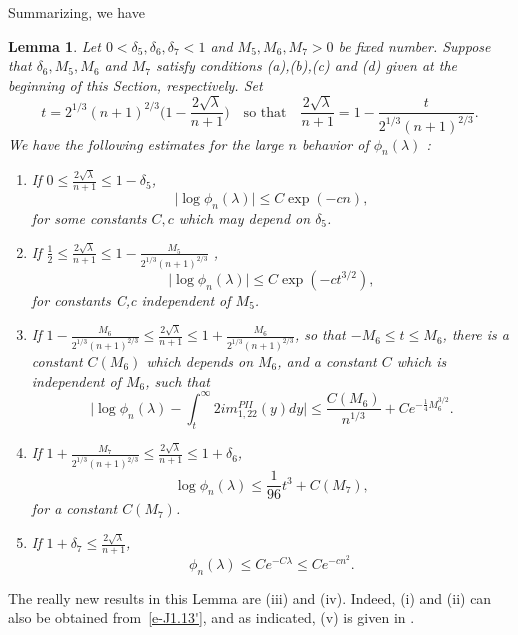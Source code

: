 \documentclass{amsart}
\newtheorem{lem}[thm]{Lemma}
\theoremstyle{definition}
\theoremstyle{remark}
\numberwithin{equation}{section}
\begin{document}
\bigskip
Summarizing, we have
\begin{lem}\label{lem-phi}
  Let $0<\delta_5,\delta_6,\delta_7<1$ and $M_5,M_6,M_7>0$ be fixed number.
  Suppose that $\delta_6, M_5, M_6$ and $M_7$ satisfy conditions 
(a),(b),(c) and (d) given at the beginning of this Section, respectively.
  Set 
\begin{equation}\label{e-z42}
    t=2^{1/3}(n+1)^{2/3}\bigl(1-\frac{2\sqrt{\lambda}}{n+1}\bigr)
\quad\text{so that}\quad 
\frac{2\sqrt{\lambda}}{n+1}=1-\frac{t}{2^{1/3}(n+1)^{2/3}}.
\end{equation}
  We have the following estimates for the large $n$ 
behavior of $\phi_n(\lambda)$ : 
  \begin{enumerate}
    \item If $0\le \frac{2\sqrt{\lambda}}{n+1} \le 1-\delta_5$,  
\begin{equation*}
  \bigl| \log{\phi_n(\lambda)} \bigr| \le C\exp(-cn), 
\end{equation*}
for some constants $C,c$ which may depend on $\delta_5$.
    \item If $\frac12 \le \frac{2\sqrt{\lambda}}{n+1} 
\le 1-\frac{M_5}{2^{1/3}{(n+1)}^{2/3}}$ ,
\begin{equation*}
  \bigl| \log{\phi_n(\lambda)} \bigr| \le C\exp(-ct^{3/2}),
\end{equation*}
for constants C,c independent of $M_5$.
    \item If $1-\frac{M_6}{2^{1/3}{(n+1)}^{2/3}} \le 
\frac{2\sqrt{\lambda}}{n+1} \le 1+\frac{M_6}{2^{1/3}{(n+1)}^{2/3}}$, 
so that $-M_6\le t\le M_6$, 
there is a constant $C(M_6)$ which depends on $M_6$, 
and a constant $C$ which is independent of $M_6$,  
such that 
\begin{equation*}
  \bigl| \log{\phi_n(\lambda)} - \int_{t}^{\infty} 2im^{PII}_{1,22}(y) dy \bigr|
\le \frac{C(M_6)}{n^{1/3}}+Ce^{-\frac14M_6^{3/2}}.
\end{equation*}
    \item If $1+\frac{M_7}{2^{1/3}{(n+1)}^{2/3}} \le \frac{2\sqrt{\lambda}}{n+1}
\le 1+\delta_6$, 
\begin{equation*}
      \log \phi_n(\lambda) \le \frac1{96}t^3 + C(M_7),
\end{equation*}
for a constant $C(M_7)$.
   \item \cite{Johan} If $1+\delta_7 \le \frac{2\sqrt{\lambda}}{n+1}$,
\begin{equation*}
   \phi_n(\lambda)\le Ce^{-C\lambda} \le Ce^{-cn^2}.
\end{equation*}
  \end{enumerate}
\end{lem}
The really new results in this Lemma are (iii) and (iv).
Indeed, (i) and (ii) can also be obtained from~\eqref{e-J1.13'}, 
and as indicated, (v) is given in \cite{Johan}.
\end{document}
